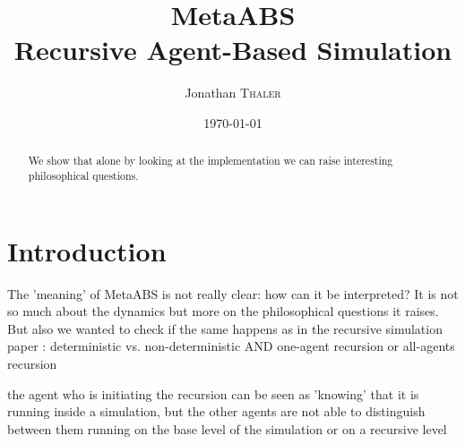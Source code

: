 \documentclass[twocolumn]{article}
\title{MetaABS \\ Recursive Agent-Based Simulation} %
\author{Jonathan \textsc{Thaler}} %
\date{\today} %
\begin{document}
\maketitle %

\begin{abstract}
We show that alone by looking at the implementation we can raise interesting philosophical questions.
\end{abstract}

\section{Introduction}
The 'meaning' of MetaABS is not really clear: how can it be interpreted?
It is not so much about the dynamics but more on the philosophical questions it raises.
But also we wanted to check if the same happens as in the recursive simulation paper \cite{gilmer_recursive_2000}: deterministic vs. non-deterministic AND one-agent recursion or all-agents recursion

the agent who is initiating the recursion can be seen as 'knowing' that it is running inside a simulation, but the other agents are not able to distinguish between them running on the base level of the simulation or on a recursive level



\end{document}
